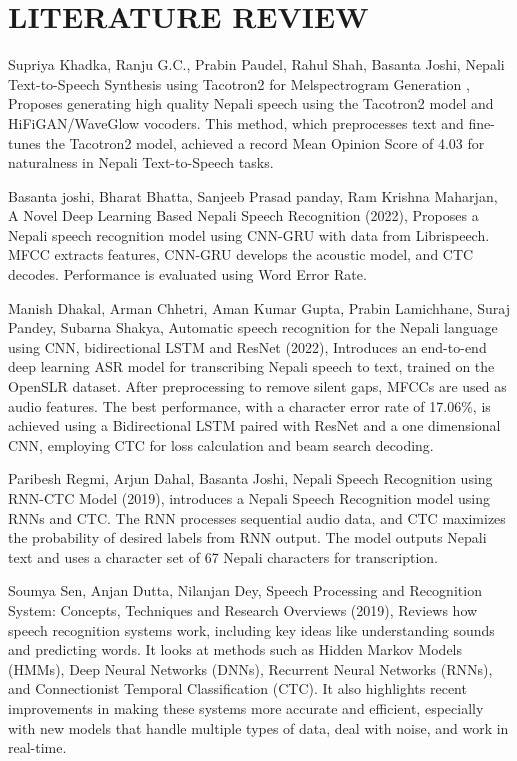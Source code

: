 \chapter{LITERATURE REVIEW}
Supriya Khadka, Ranju G.C., Prabin Paudel, Rahul Shah, Basanta Joshi, Nepali Text-to-Speech Synthesis using Tacotron2 for Melspectrogram Generation \cite{first}, Proposes generating high quality Nepali speech using the Tacotron2 model and HiFiGAN/WaveGlow vocoders. This method, which preprocesses text and fine-tunes the Tacotron2 model, achieved a record Mean Opinion Score of 4.03 for naturalness in Nepali Text-to-Speech tasks.  
\par


Basanta joshi, Bharat Bhatta, Sanjeeb Prasad panday, Ram Krishna Maharjan, A Novel Deep Learning Based Nepali Speech Recognition \cite{inbook} (2022),  Proposes a Nepali speech recognition model using CNN-GRU with data from Librispeech. MFCC extracts features, CNN-GRU develops the acoustic model, and CTC decodes. Performance is evaluated using Word Error Rate. 



\par



Manish Dhakal, Arman Chhetri, Aman Kumar Gupta, Prabin Lamichhane, Suraj Pandey, Subarna Shakya, Automatic speech recognition for the Nepali language using CNN, bidirectional LSTM and ResNet \cite{inproceedings} (2022),  Introduces an end-to-end deep learning ASR model for transcribing Nepali speech to text, trained on the OpenSLR dataset. After preprocessing to 
remove silent gaps, MFCCs are used as audio features. The best performance, with a character error rate of 17.06\%, is achieved using a Bidirectional LSTM paired with ResNet and a one dimensional CNN, employing CTC for loss calculation and beam search decoding. 



\par


Paribesh Regmi, Arjun Dahal, Basanta Joshi, Nepali Speech Recognition using RNN-CTC Model \cite{link4} (2019), introduces a Nepali Speech Recognition model using RNNs and CTC. The RNN processes sequential audio data, and CTC maximizes the probability of desired labels from RNN output. The model outputs Nepali text and uses a character set of 67 Nepali characters for transcription. 


\par

Soumya Sen, Anjan Dutta, Nilanjan Dey, Speech Processing and Recognition System: Concepts, Techniques and Research Overviews \cite{link5} (2019), Reviews how speech recognition systems work, including key ideas like understanding sounds and predicting words. It looks at methods such as Hidden Markov Models (HMMs), Deep Neural Networks (DNNs), Recurrent Neural Networks (RNNs), and Connectionist Temporal Classification (CTC). It also highlights recent improvements in making these systems more accurate and efficient, especially with new models that handle multiple types of data, deal with noise, and work in real-time. 